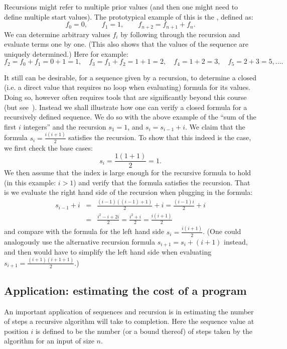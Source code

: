 Recursions might refer to multiple prior values (and then one might need to define
multiple start values). The prototypical example of this is the , defined as:
\[
f_0=0,\qquad f_1=1,\qquad f_{n+2}=f_{n+1}+f_n.
\]
We can determine arbitrary values $f_i$ by following through the recursion and evaluate
terms one by one. (This also shows that the values of the sequence are uniquely
determined.) Here for example:
\[
f_2=f_0+f_1=0+1=1,\quad
f_3=f_1+f_2=1+1=2,\quad
f_4=1+2=3,\quad
f_5=2+3=5,\ldots .
\]

\medskip

It still can be desirable, for a sequence given by a recursion, to determine a closed
(i.e. a direct value that requires no loop when evaluating)
formula for its values. Doing so, however often requires tools that are significantly
beyond this course (but see~). Instead we shall illustrate how one can verify a closed formula for
a recursively defined sequence.
We do so with the above example of the ``sum of the first $i$ integers'' and the
recursion
$s_1=1$, and $s_i=s_{i-1}+i$. We claim that the formula $s_i=\frac{i(i+1)}{2}$ satisfies
the recursion. To show that this indeed is the case, we first check the base cases:
\[
s_i=\frac{1(1+1)}{2}=1.
\]
We then assume that the index is large enough for the recursive formula to hold (in this
example: $i>1$) and verify that the formula satisfies the recursion. That is
we evaluate the right hand side of the recursion when plugging in the formula:
\begin{eqnarray*}
s_{i-1}+i&=&\frac{(i-1)((i-1)+1)}{2}+i=\frac{(i-1)i}{2}+i\\
&=&\frac{i^2-i+2i}{2}=\frac{i^2+i}{2}=\frac{i(i+1)}{2}
\end{eqnarray*}
and compare with the formula for the left hand side $s_i=\frac{i(i+1)}{2}$. (One could
analogously use the alternative recursion formula $s_{i+1}=s_i+(i+1)$ instead, and then
would have to simplify the left hand side when evaluating
$s_{i+1}=\frac{(i+1)(i+1+1)}{2}$.)

%

\subsection{Application: estimating the cost of a program}

An important application of sequences and recursion is in estimating the
number of steps a recursive algorithm will take to completion. Here the
sequence value at position $i$ is defined to be the number (or a bound
thereof) of steps taken by the algorithm for an input of size $n$.

